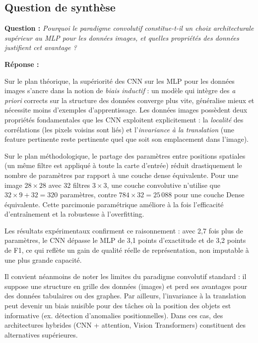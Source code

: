 \documentclass[11pt,a4paper]{article}
\begin{document}
\subsection{Question de synthèse}

\textbf{Question :} \textit{Pourquoi le paradigme convolutif constitue-t-il un choix
architecturale supérieur au MLP pour les données images, et quelles propriétés des
données justifient cet avantage ?}

\textbf{Réponse :}

Sur le plan théorique, la supériorité des CNN sur les MLP pour les données images
s'ancre dans la notion de \textit{biais inductif} : un modèle qui intègre des
\textit{a priori} corrects sur la structure des données converge plus vite, généralise
mieux et nécessite moins d'exemples d'apprentissage. Les données images possèdent deux
propriétés fondamentales que les CNN exploitent explicitement : la \textit{localité}
des corrélations (les pixels voisins sont liés) et l'\textit{invariance à la translation}
(une feature pertinente reste pertinente quel que soit son emplacement dans l'image).

Sur le plan méthodologique, le partage des paramètres entre positions spatiales (un
même filtre est appliqué à toute la carte d'entrée) réduit drastiquement le nombre de
paramètres par rapport à une couche dense équivalente. Pour une image $28 \times 28$
avec 32 filtres $3\times3$, une couche convolutive n'utilise que $32 \times 9 + 32 = 320$
paramètres, contre $784 \times 32 = 25\,088$ pour une couche Dense équivalente.
Cette parcimonie paramétrique améliore à la fois l'efficacité d'entraînement et la
robustesse à l'overfitting.

Les résultats expérimentaux confirment ce raisonnement : avec 2,7 fois plus de paramètres,
le CNN dépasse le MLP de 3,1 points d'exactitude et de 3,2 points de F1, ce qui reflète
un gain de qualité réelle de représentation, non imputable à une plus grande capacité.

Il convient néanmoins de noter les limites du paradigme convolutif standard : il suppose
une structure en grille des données (images) et perd ses avantages pour des données
tabulaires ou des graphes. Par ailleurs, l'invariance à la translation peut devenir
un biais nuisible pour des tâches où la position des objets est informative (ex.
détection d'anomalies positionnelles). Dans ces cas, des architectures hybrides
(CNN + attention, Vision Transformers) constituent des alternatives supérieures.
\end{document}
